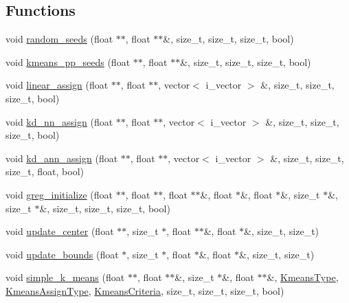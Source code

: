 \subsection*{Functions}
\begin{DoxyCompactItemize}
\item 
void \hyperlink{namespaceSimpleCluster_ab8b3017ed752adbc20adea84b5465513}{random\-\_\-seeds} (float $\ast$$\ast$, float $\ast$$\ast$\&, size\-\_\-t, size\-\_\-t, size\-\_\-t, bool)
\item 
void \hyperlink{namespaceSimpleCluster_a61369fe3d02f700900a2708494d161bd}{kmeans\-\_\-pp\-\_\-seeds} (float $\ast$$\ast$, float $\ast$$\ast$\&, size\-\_\-t, size\-\_\-t, size\-\_\-t, bool)
\item 
void \hyperlink{namespaceSimpleCluster_a3020938c4dc398eb0a4fa6139cfb95f1}{linear\-\_\-assign} (float $\ast$$\ast$, float $\ast$$\ast$, vector$<$ i\-\_\-vector $>$ \&, size\-\_\-t, size\-\_\-t, size\-\_\-t, bool)
\item 
void \hyperlink{namespaceSimpleCluster_a918080688b86942a5f236438ce3f5088}{kd\-\_\-nn\-\_\-assign} (float $\ast$$\ast$, float $\ast$$\ast$, vector$<$ i\-\_\-vector $>$ \&, size\-\_\-t, size\-\_\-t, size\-\_\-t, bool)
\item 
void \hyperlink{namespaceSimpleCluster_a30970441d9c185bf8e0fa81f35e84e2d}{kd\-\_\-ann\-\_\-assign} (float $\ast$$\ast$, float $\ast$$\ast$, vector$<$ i\-\_\-vector $>$ \&, size\-\_\-t, size\-\_\-t, size\-\_\-t, float, bool)
\item 
void \hyperlink{namespaceSimpleCluster_a24c5782c22732dd842d36b239ef7713c}{greg\-\_\-initialize} (float $\ast$$\ast$, float $\ast$$\ast$, float $\ast$$\ast$\&, float $\ast$\&, float $\ast$\&, size\-\_\-t $\ast$\&, size\-\_\-t $\ast$\&, size\-\_\-t, size\-\_\-t, size\-\_\-t, bool)
\item 
void \hyperlink{namespaceSimpleCluster_aa081eb35980718b1c716483e73b44883}{update\-\_\-center} (float $\ast$$\ast$, size\-\_\-t $\ast$, float $\ast$$\ast$\&, float $\ast$\&, size\-\_\-t, size\-\_\-t)
\item 
void \hyperlink{namespaceSimpleCluster_a9787e16178fb6935a3a96febb2b6ea2b}{update\-\_\-bounds} (float $\ast$, size\-\_\-t $\ast$, float $\ast$\&, float $\ast$\&, size\-\_\-t, size\-\_\-t)
\item 
void \hyperlink{namespaceSimpleCluster_a9c97cac3acfdd7095905f6c22488ee30}{simple\-\_\-k\-\_\-means} (float $\ast$$\ast$, float $\ast$$\ast$\&, size\-\_\-t $\ast$\&, float $\ast$$\ast$\&, \hyperlink{namespaceSimpleCluster_a8a8f57121b69a7b43575e4d6a53928e2}{Kmeans\-Type}, \hyperlink{namespaceSimpleCluster_a1ad2d6129171ff9a5ee57f48b5f3f6e1}{Kmeans\-Assign\-Type}, \hyperlink{structSimpleCluster_1_1KmeansCriteria}{Kmeans\-Criteria}, size\-\_\-t, size\-\_\-t, size\-\_\-t, bool)

\end{DoxyCompactItemize}
